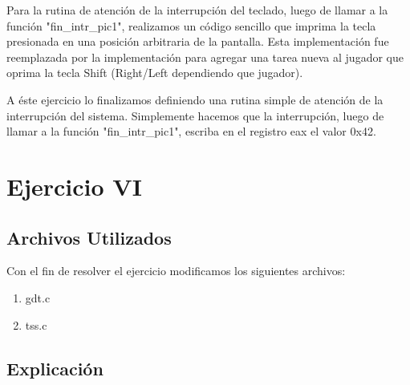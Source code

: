 \documentclass[a4paper]{article}
\begin{document}
Para la rutina de atención de la interrupción del teclado, luego de llamar a la función "fin_intr_pic1", realizamos un código sencillo que imprima la tecla presionada en una posición arbitraria de la pantalla. Esta implementación fue reemplazada por la implementación para agregar una tarea nueva al jugador que oprima la tecla Shift (Right/Left dependiendo que jugador).

A éste ejercicio lo finalizamos definiendo una rutina simple de atención de la interrupción del sistema. Simplemente hacemos que la interrupción, luego de llamar a la función "fin_intr_pic1", escriba en el registro eax el valor 0x42.


\newpage

\section{Ejercicio VI}
\subsection{Archivos Utilizados}

Con el fin de resolver el ejercicio modificamos los siguientes archivos:

\begin{enumerate}

\item gdt.c
\item tss.c

\end{enumerate}


\subsection{Explicación}
\end{document}
